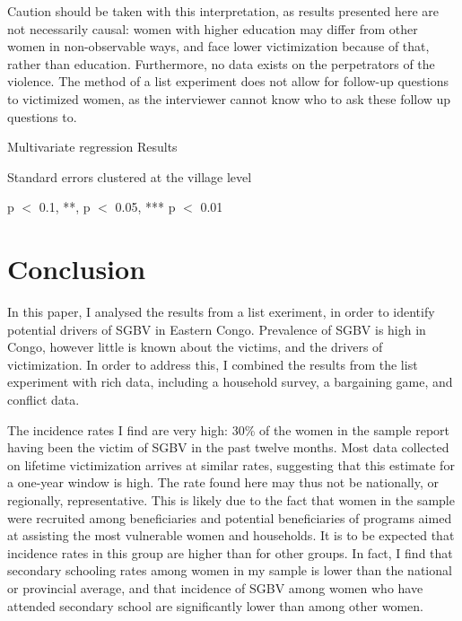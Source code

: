 \documentclass[10pt,a4paper,abstract=on]{scrartcl} %
\begin{document}
Caution should be taken with this interpretation, as results presented here are not necessarily causal: women with higher education may differ from other women in non-observable ways, and face lower victimization because of that, rather than education. Furthermore, no data exists on the perpetrators of the violence. The method of a list experiment does not allow for follow-up questions to victimized women, as the interviewer cannot know who to ask these follow up questions to.

\begin{threeparttable}
	\caption{Multivariate regression Results}\label{tab:results_regression}
	\begin{center}
	
	
	\begin{tablenotes}
	\small
	 \item Standard errors clustered at the village level
	 \item * p $<$ 0.1, **, p $<$ 0.05, *** p $<$ 0.01
	\end{tablenotes}
	\end{center}
\end{threeparttable}

\section*{Conclusion}
In this paper, I analysed the results from a list exeriment, in order to identify potential drivers of SGBV in Eastern Congo. Prevalence of SGBV is high in Congo, however little is known about the victims, and the drivers of victimization. In order to address this, I combined the results from the list experiment with rich  data, including a household survey, a bargaining game, and conflict data.

The incidence rates I find are very high: 30\% of the women in the sample report having been the victim of SGBV in the past twelve months. Most data collected on lifetime victimization arrives at similar rates, suggesting that this estimate for a one-year window is high. The rate found here may thus not be nationally, or regionally, representative. This is likely due to the fact that women in the sample were recruited among beneficiaries and potential beneficiaries of programs aimed at assisting the most vulnerable women and households. It is to be expected that incidence rates in this group are higher than for other groups. In fact, I find that secondary schooling rates among women in my sample is lower than the national or provincial average, and that incidence of SGBV among women who have attended secondary school are significantly lower than among other women.
\end{document}
